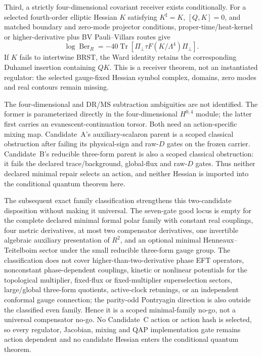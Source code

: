 \documentclass[11pt]{article}
\theoremstyle{definition}
\theoremstyle{remark}
\begin{document}
Third, a strictly four-dimensional covariant receiver exists conditionally.
For a selected fourth-order elliptic Hessian $K$ satisfying
$K^\sharp=K$, $[Q,K]=0$, and matched boundary and zero-mode projector
conditions, proper-time/heat-kernel or higher-derivative plus BV
Pauli--Villars routes give
\[
 \log\operatorname{Ber}_R
 =-40\operatorname{Tr}\!\left[
 \Pi_\perp\tau F(K/\Lambda^4)\Pi_\perp\right].
\]
If $K$ fails to intertwine BRST, the Ward identity retains the corresponding
Duhamel insertion containing $QK$.  This is a receiver theorem, not an
instantiated regulator: the selected gauge-fixed Hessian symbol complex,
domains, zero modes and real contours remain missing.

The four-dimensional and DR/MS subtraction ambiguities are not identified.
The former is parameterized directly in the four-dimensional $H^{0,4}$
module; the latter first carries an evanescent-continuation torsor.  Both need
an action-specific mixing map.  Candidate~A's auxiliary-scalaron parent is a
scoped classical obstruction after failing its physical-sign and raw-$D$
gates on the frozen carrier.  Candidate~B's reducible three-form parent is
also a scoped classical obstruction: it fails the declared trace/background,
global-flux and raw-$D$ gates.  Thus neither declared minimal repair selects
an action, and neither Hessian is imported into the conditional quantum
theorem here.

The subsequent exact family classification strengthens this two-candidate
disposition without making it universal.  The seven-gate good locus is empty
for the complete declared minimal formal polar family with constant real
couplings, four metric derivatives, at most two compensator derivatives, one
invertible algebraic auxiliary presentation of $R^2$, and an optional minimal
Henneaux--Teitelboim sector under the small reducible three-form gauge group.
The classification does not cover higher-than-two-derivative phase EFT
operators, nonconstant phase-dependent couplings, kinetic or nonlinear
potentials for the topological multiplier, fixed-flux or fixed-multiplier
superselection sectors, large/global three-form quotients, active-clock
retunings, or an independent conformal gauge connection; the parity-odd
Pontryagin direction is also outside the classified even family.  Hence it is
a scoped minimal-family no-go, not a universal compensator no-go.  No
Candidate~C action or action hash is selected, so every regulator, Jacobian,
mixing and QAP implementation gate remains action dependent and no candidate
Hessian enters the conditional quantum theorem.
\end{document}
